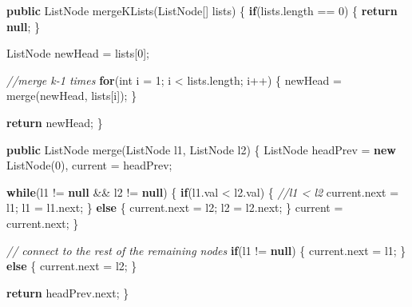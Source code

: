 \documentclass[]{book}
\newenvironment{Shaded}{\begin{snugshade}}{\end{snugshade}}
\newcommand{\CommentTok}[1]{\textcolor[rgb]{0.56,0.35,0.01}{\textit{#1}}}
\newcommand{\DataTypeTok}[1]{\textcolor[rgb]{0.13,0.29,0.53}{#1}}
\newcommand{\DecValTok}[1]{\textcolor[rgb]{0.00,0.00,0.81}{#1}}
\newcommand{\FunctionTok}[1]{\textcolor[rgb]{0.00,0.00,0.00}{#1}}
\newcommand{\KeywordTok}[1]{\textcolor[rgb]{0.13,0.29,0.53}{\textbf{#1}}}
\newcommand{\NormalTok}[1]{#1}
\begin{document}
\begin{Shaded}
\begin{Highlighting}[]
\KeywordTok{public}\NormalTok{ ListNode }\FunctionTok{mergeKLists}\NormalTok{(ListNode[] lists) \{}
    \KeywordTok{if}\NormalTok{(lists.}\FunctionTok{length}\NormalTok{ == }\DecValTok{0}\NormalTok{) \{}
        \KeywordTok{return} \KeywordTok{null}\NormalTok{;}
\NormalTok{    \}}

\NormalTok{    ListNode newHead = lists[}\DecValTok{0}\NormalTok{];}

    \CommentTok{//merge k-1 times}
    \KeywordTok{for}\NormalTok{(}\DataTypeTok{int}\NormalTok{ i = }\DecValTok{1}\NormalTok{; i < lists.}\FunctionTok{length}\NormalTok{; i++) \{}
\NormalTok{        newHead = }\FunctionTok{merge}\NormalTok{(newHead, lists[i]);}
\NormalTok{    \}}

    \KeywordTok{return}\NormalTok{ newHead;}
\NormalTok{\}}

\KeywordTok{public}\NormalTok{ ListNode }\FunctionTok{merge}\NormalTok{(ListNode l1, ListNode l2) \{}
\NormalTok{    ListNode headPrev = }\KeywordTok{new} \FunctionTok{ListNode}\NormalTok{(}\DecValTok{0}\NormalTok{), current = headPrev;}

    \KeywordTok{while}\NormalTok{(l1 != }\KeywordTok{null}\NormalTok{ && l2 != }\KeywordTok{null}\NormalTok{) \{}
        \KeywordTok{if}\NormalTok{(l1.}\FunctionTok{val}\NormalTok{ < l2.}\FunctionTok{val}\NormalTok{) \{}
            \CommentTok{//l1 < l2}
\NormalTok{            current.}\FunctionTok{next}\NormalTok{ = l1;}
\NormalTok{            l1 = l1.}\FunctionTok{next}\NormalTok{;}
\NormalTok{        \} }\KeywordTok{else}\NormalTok{ \{}
\NormalTok{            current.}\FunctionTok{next}\NormalTok{ = l2;}
\NormalTok{            l2 = l2.}\FunctionTok{next}\NormalTok{;}
\NormalTok{        \}}
\NormalTok{        current = current.}\FunctionTok{next}\NormalTok{;}
\NormalTok{    \}}

    \CommentTok{// connect to the rest of the remaining nodes}
    \KeywordTok{if}\NormalTok{(l1 != }\KeywordTok{null}\NormalTok{) \{}
\NormalTok{        current.}\FunctionTok{next}\NormalTok{ = l1;}
\NormalTok{    \} }\KeywordTok{else}\NormalTok{ \{}
\NormalTok{        current.}\FunctionTok{next}\NormalTok{ = l2;}
\NormalTok{    \}}

    \KeywordTok{return}\NormalTok{ headPrev.}\FunctionTok{next}\NormalTok{;}
\NormalTok{\}}
\end{Highlighting}
\end{Shaded}
\end{document}
